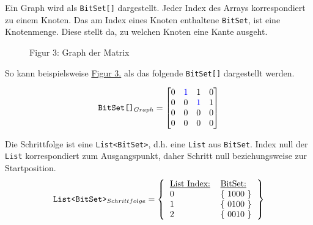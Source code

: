 \documentclass[a4paper,10pt,ngerman]{scrartcl}
\begin{document}
    Ein Graph wird als \texttt{BitSet[]} dargestellt.
    Jeder Index des Arrays korrespondiert zu einem Knoten.
    Das am Index eines Knoten enthaltene \texttt{BitSet}, ist eine Knotenmenge.
    Diese stellt da, zu welchen Knoten eine Kante ausgeht.




    \begin{figure}[!h]
        \centering
        \caption{Figur 3: Graph der Matrix}

        \label{fig:Figure3}
    \end{figure}

    So kann beispielsweise \hyperref[fig:Figure3]{Figur 3.} als das folgende \texttt{BitSet[]} dargestellt werden.

    \[
        \texttt{BitSet[]}_{Graph} = \begin{bmatrix}
                                        0 & \textcolor{blue}{1} & 1                   & 0 \\
                                        0 & 0                   & \textcolor{blue}{1} & 1 \\
                                        0 & 0                   & 0                   & 0 \\
                                        0 & 0                   & 0                   & 0 \\
        \end{bmatrix}
    \]

    Die Schrittfolge ist eine \texttt{List<BitSet>},
    d.h. eine \texttt{List} aus \texttt{BitSet}.
    Index null der \texttt{List} korrespondiert zum Ausgangspunkt,
    daher Schritt null beziehungsweise zur Startposition.
    \[
        \texttt{List<BitSet>}_{Schrittfolge} = \left\lbrace
        \begin{tabular}{ll}
            \underline{\text{List Index:}} & \underline{\text{BitSet:}} \\
            0                              & \{ 1000 \}                 \\
            1                              & \{ 0100 \}                 \\
            2                              & \{ 0010 \}                 \\
        \end{tabular}
        \right\rbrace
    \]
\end{document}
